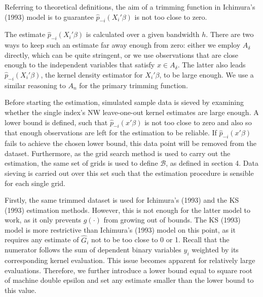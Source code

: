 \documentclass[a4paper]{article}
\begin{document}
Referring to theoretical definitions, the aim of a trimming function in Ichimura's (1993) \cite{[6]} model is to guarantee $\hat{p}_{-i}(X_i'\beta)$ is not too close to zero. 

The estimate $\hat{p}_{-i}(X_i'\beta)$ is calculated over a given bandwidth $h$. There are two ways to keep such an estimate far away enough from zero: either we  employ $A_\delta$  directly, which can be quite stringent, or we use observations that are close enough to the independent variables that satisfy $x \in A_\delta$. The latter also leads $\hat{p}_{-i}(X_i'\beta)$, the kernel density estimator for $X_i'\beta$, to be large enough. We use a similar reasoning to $A_n$ for the primary trimming function.

Before starting the estimation, simulated sample data is sieved by examining whether the single index's NW leave-one-out kernel estimates are large enough. A lower bound is defined, such that $\hat{p}_{-i}(x'\beta)$ is not too close to zero and also so that enough observations are left  for the estimation to be reliable. If $\hat{p}_{-i}(x'\beta)$ fails to achieve the chosen lower bound, this data point will be removed from the dataset.
Furthermore, as the grid search method is used to carry out the estimation, the same set of grids is used to define $\mathcal{B}$, as defined in section 4. Data sieving is carried out over this set such that the estimation procedure is sensible for each single grid.

Firstly, the same trimmed dataset is used for Ichimura's (1993) \cite{[6]} and the KS (1993) \cite{[12]} estimation methods. However, this is not enough for the latter model to work, as it only prevents $g(\cdot)$ from growing out of bounds.  The KS (1993) \cite{[12]} model is more restrictive than Ichimura's (1993) \cite{[6]} model on this point, as it requires any estimate of $\hat{G}_i$ not to be too close to 0 or 1. Recall that the numerator follows the sum of dependent binary variables $y_i$ weighted by its corresponding kernel evaluation. This issue becomes apparent for relatively large evaluations. Therefore, we further introduce a lower bound equal to square root of machine double epsilon and set any estimate smaller than the lower bound to this value.
\end{document}

